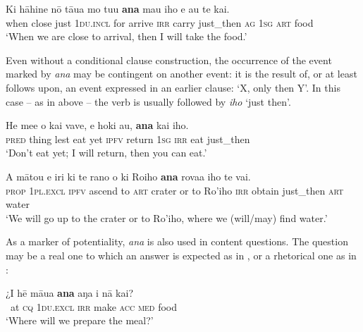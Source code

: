 \ea\label{ex:11.168}
\gll Ki hāhine nō tāua mo tu{\ꞌ}u \textbf{ana} ma{\ꞌ}u iho e au te kai.\\
when close just \textsc{1du.incl} for arrive \textsc{irr} carry just\_then \textsc{ag} \textsc{1sg} \textsc{art} food\\

\glt
‘When we are close to arrival, then I will take the food.’ \textstyleExampleref{[R215.026]} 
\z

Even without a conditional clause construction, the occurrence of the event marked by \textit{ana} may be contingent on another event: it is the result of, or at least follows upon, an event expressed in an earlier clause: ‘X, only then Y’. In this case – as in  above – the verb is usually followed by \textit{iho} ‘just then’. 

\ea\label{ex:11.169}
\gll He me{\ꞌ}e {\ꞌ}o kai vave, e hoki au, \textbf{ana} kai iho. \\
\textsc{pred} thing lest eat yet \textsc{ipfv} return \textsc{1sg} \textsc{irr} eat just\_then \\

\glt 
‘Don’t{\rmfnm} eat yet; I will return, then you can eat.’ \textstyleExampleref{[Mtx-3-01.194]}
\z
{}

\ea\label{ex:11.170}
\gll A mātou e iri ki te rano {\ꞌ}o ki Ro{\ꞌ}iho \textbf{ana} rova{\ꞌ}a iho te vai. \\
\textsc{prop} \textsc{1pl.excl} \textsc{ipfv} ascend to \textsc{art} crater or to Ro’iho \textsc{irr} obtain just\_then \textsc{art} water \\

\glt
‘We will go up to the crater or to Ro’iho, where we (will/may) find water.’ \textstyleExampleref{[R487.035]} 
\z

As a marker of potentiality, \textit{ana} is also used in content questions. The question may be a real one to which an answer is expected as in , or a rhetorical one as in :

\ea\label{ex:11.171}
\gll ¿{\ꞌ}I hē māua \textbf{ana} aŋa i nā kai? \\
~at \textsc{cq} \textsc{1du.excl} \textsc{irr} make \textsc{acc} \textsc{med} food \\

\glt 
‘Where will we prepare the meal?’ \textstyleExampleref{[Luke 22:9]}
\z

